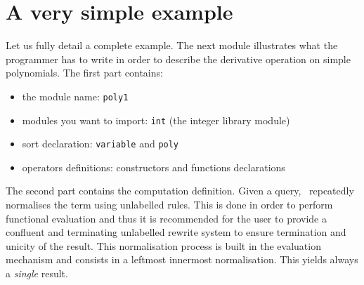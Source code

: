 


\section{A very simple example}

Let us fully detail a complete example.
The next module illustrates what the programmer
has to write in order to describe the derivative operation on simple
polynomials. The first part contains:
\begin{itemize}
\item the module name: \texttt{poly1}
\item modules you want  to  import: \texttt{int} (the  integer library
        module)
\item sort declaration: \texttt{variable} and \texttt{poly}
\item operators definitions: constructors and functions declarations
\end{itemize}

The second part contains the computation definition.
Given a query, \elan\ repeatedly normalises the term using unlabelled
rules. 
This is done in order to perform functional evaluation and thus
it is recommended for the user to provide a confluent and terminating
unlabelled rewrite system to ensure termination and unicity of the
result. This normalisation process is built in the evaluation
mechanism and consists in a leftmost innermost normalisation. This
yields always a {\em single} result.

